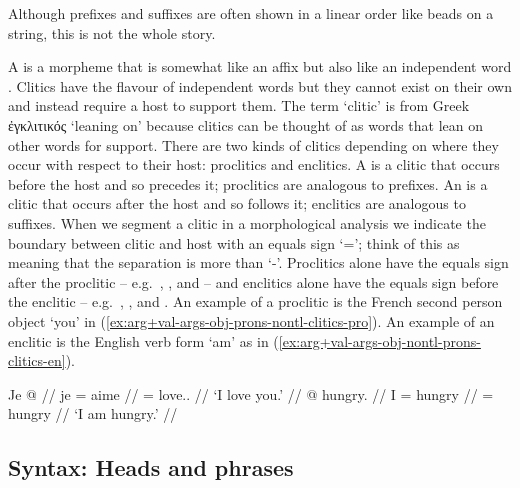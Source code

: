 Although prefixes and suffixes are often shown in a linear order like beads on a string, this is not the whole story.

A  is a morpheme that is somewhat like an affix but also like an independent word \parencite[166]{booij:2007}.
Clitics have the flavour of independent words but they cannot exist on their own and instead require a host to support them.
The term ‘clitic’ is from Greek ἐγκλιτικός  ‘leaning on’ because clitics can be thought of as words that lean on other words for support.
There are two kinds of clitics depending on where they occur with respect to their host: proclitics and enclitics.
A  is a clitic that occurs before the host and so precedes it; proclitics are analogous to prefixes.
An  is a clitic that occurs after the host and so follows it; enclitics are analogous to suffixes.
When we segment a clitic in a morphological analysis we indicate the boundary between clitic and host with an equals sign ‘=’; think of this as meaning that the separation is more than ‘-’.
Proclitics alone have the equals sign after the proclitic – e.g.\ , , and  – and enclitics alone have the equals sign before the enclitic – e.g.\ , , and .
An example of a proclitic is the French second person object  ‘you’ in (\ref{ex:arg+val-args-obj-prons-nontl-clitics-pro}).
An example of an enclitic is the English verb form  ‘am’ as in (\ref{ex:arg+val-args-obj-nontl-prons-clitics-en}).

\pex\label{exx:arg+val-args-obj-prons-nontl-clitics}%
\a\label{ex:arg+val-args-obj-prons-nontl-clitics-pro}%
%
\begingl
	\gla	Je  @ {} //
	\glb	je = aime //
	\glc	{} = love.. //
	\glft	‘I love you.’
		//
\endgl
\a\label{ex:arg+val-args-obj-nontl-prons-clitics-en}%
%
\begingl
	\gla	{} @ {} hungry. //
	\glb	I = hungry //
	\glc	{} = hungry //
	\glft	‘I am hungry.’
		//
\endgl
\xe


\subsection{Syntax: Heads and phrases}\label{sec:intro-ling-synx}


